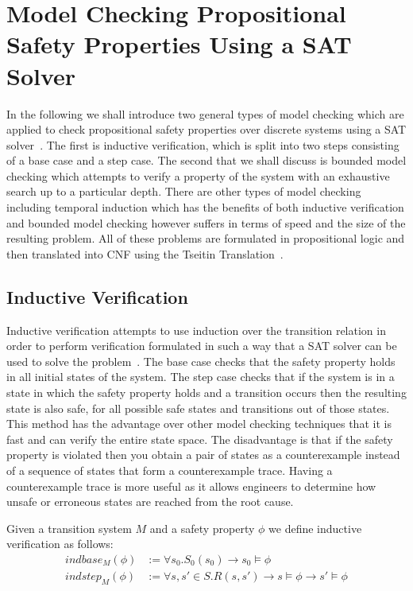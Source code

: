 \section{Model Checking Propositional Safety Properties Using a SAT Solver}


In the following we shall introduce two general types of model checking  which are applied to check propositional safety properties over discrete systems using a SAT solver~\cite{MS00,EC01}. The first is inductive verification, which is split into two steps consisting of a base case and a step case.  The second that we shall discuss is bounded model checking which attempts to verify a property of the system with an exhaustive search up to a particular depth. There are other types of model checking including temporal induction which has the benefits of both inductive verification and bounded model checking however suffers in terms of speed and the size of the resulting problem. All of these problems are formulated in propositional logic and then translated into CNF using the Tseitin Translation~\cite{GT83}.



\subsection*{Inductive Verification}

Inductive verification attempts to use induction over the transition relation in order to perform verification formulated in such a way that a SAT solver can be used to solve the problem~\cite{MS00}. The base case checks that the safety property holds in all initial states of the system. The step case checks that if the system is in a state in which the safety property holds and a transition occurs then the resulting state is also safe, for all possible safe states and transitions out of those states. This method has the advantage over other model checking techniques that it is fast and can verify the entire state space. The disadvantage is that if the safety property is violated then you obtain a pair of states as a counterexample instead of a sequence of states that form a counterexample trace. Having a counterexample trace is more useful as it allows engineers to determine how unsafe or erroneous states are reached from the root cause.
\medskip
\begin{mydef}
Given a transition system $M$ and a safety property $\phi$ we define inductive verification as follows:
\begin{align*}
indbase_M(\phi)  &:= \forall s_0. S_0(s_0)  \to s_0 \models \phi \\
indstep_M(\phi) &:= \forall s,s' \in S. R(s, s') \to s \models \phi  \to s' \models \phi
\end{align*}
\end{mydef}
\medskip
